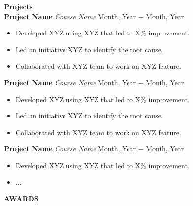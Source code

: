 \documentclass{article}
\begin{document}
\noindent \textbf{\underline{Projects}} \\
\noindent \textbf{Project Name} \textit{Course Name} \hfill  Month, Year $-$ Month, Year
\begin{itemize}[noitemsep,nolistsep,leftmargin=*]
\item {Developed XYZ using XYZ that led to X\% improvement.}
\item {Led an initiative XYZ to identify the root cause.}
\item {Collaborated with XYZ team to work on XYZ feature. \\}
\end{itemize}

\noindent \textbf{Project Name} \textit{Course Name} \hfill  Month, Year $-$ Month, Year
\begin{itemize}[noitemsep,nolistsep,leftmargin=*]
\item {Developed XYZ using XYZ that led to X\% improvement.}
\item {Led an initiative XYZ to identify the root cause.}
\item {Collaborated with XYZ team to work on XYZ feature. \\}
\end{itemize}

\noindent \textbf{Project Name} \textit{Course Name} \hfill  Month, Year $-$ Month, Year
\begin{itemize}[noitemsep,nolistsep,leftmargin=*]
\item {Developed XYZ using XYZ that led to X\% improvement.}
\item {... \\}
\end{itemize}

\noindent \textbf{\underline{AWARDS}} \\
\end{document}
